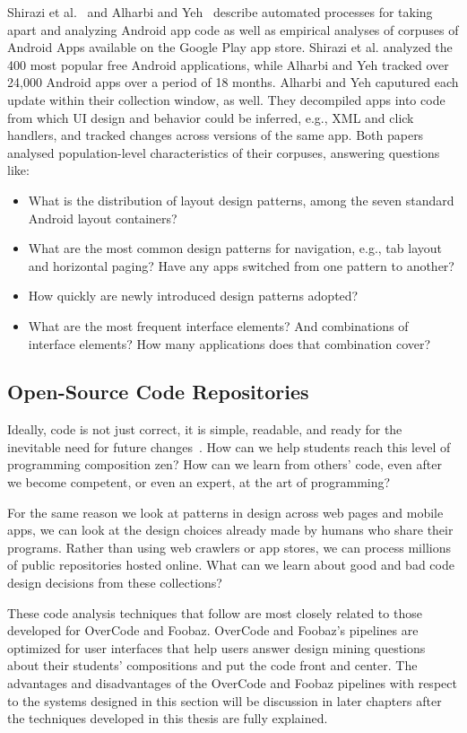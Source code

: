 Shirazi et al.~\cite{Shirazi} and Alharbi and Yeh~\cite{Alharbi} describe automated processes for taking apart and analyzing Android app code as well as empirical analyses of corpuses of Android Apps available on the Google Play app store. Shirazi et al. analyzed the 400 most popular free Android applications, while Alharbi and Yeh tracked over 24,000 Android apps over a period of 18 months. Alharbi and Yeh caputured each update within their collection window, as well. They decompiled apps into code from which UI design and behavior could be inferred, e.g., XML and click handlers, and tracked changes across versions of the same app. Both papers analysed population-level characteristics of their corpuses, answering questions like:
\begin{itemize}
\item     What is the distribution of layout design patterns, among the seven standard Android layout containers?
\item     What are the most common design patterns for navigation, e.g., tab layout and horizontal paging? Have any apps switched from one pattern to another?
\item     How quickly are newly introduced design patterns adopted?
\item     What are the most frequent interface elements? And combinations of interface elements? How many applications does that combination cover?
\end{itemize}

\subsection{Open-Source Code Repositories}

Ideally, code is not just correct, it is simple, readable, and ready for the inevitable need for future changes~\cite{peters2010zen,6005notes}. How can we help students reach this level of programming composition zen? How can we learn from others' code, even after we become competent, or even an expert, at the art of programming?

For the same reason we look at patterns in design across web pages and mobile apps, we can look at the design choices already made by humans who share their programs. Rather than using web crawlers or app stores, we can process millions of public repositories hosted online. What can we learn about good and bad code design decisions from these collections?

These code analysis techniques that follow are most closely related to those developed for OverCode and Foobaz. OverCode and Foobaz's pipelines are optimized for user interfaces that help users answer design mining questions about their students' compositions and put the code front and center. The advantages and disadvantages of the OverCode and Foobaz pipelines with respect to the systems designed in this section will be discussion in later chapters after the techniques developed in this thesis are fully explained.

